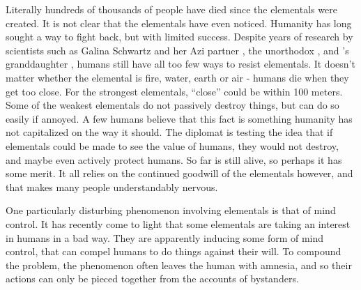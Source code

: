 \documentclass[blue]{elementals}
\begin{document}

Literally hundreds of thousands of people have died since the elementals were created. It is not clear that the elementals have even noticed. Humanity has long sought a way to fight back, but with limited success. Despite years of research by scientists such as Galina Schwartz and her Azi partner \cScientist{}, the unorthodox \cMS{}, and \cGrandfather{}'s granddaughter \cGD{}, humans still have all too few ways to resist elementals.  It doesn't matter whether the elemental is fire, water, earth or air - humans die when they get too close. For the strongest elementals, ``close'' could be within 100 meters. Some of the weakest elementals do not passively destroy things, but can do so easily if annoyed. A few humans believe that this fact is something humanity has not capitalized on the way it should. The diplomat \cDiplomat{} is testing the idea that if elementals could be made to see the value of humans, they would not destroy, and maybe even actively protect humans.  So far \cDiplomat{} is still alive, so perhaps it has some merit. It all relies on the continued goodwill of the elementals however, and that makes many people understandably nervous.

One particularly disturbing phenomenon involving elementals is that of mind control. It has recently come to light that some elementals are taking an interest in humans in a bad way. They are apparently inducing some form of mind control, that can compel humans to do things against their will. To compound the problem, the phenomenon often leaves the human with amnesia, and so their actions can only be pieced together from the accounts of bystanders.
\end{document}
